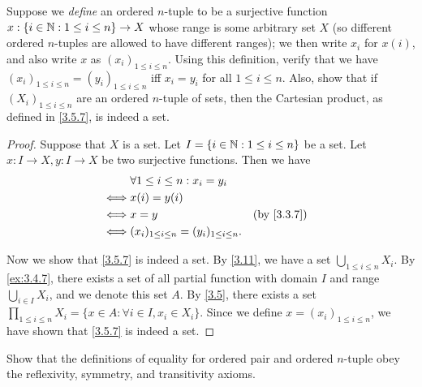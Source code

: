 \begin{ex}\label{ex:3.5.2}
  Suppose we \emph{define} an ordered \(n\)-tuple to be a surjective function \(x : \{i \in \mathbb{N} : 1 \leq i \leq n\} \to X\) whose range is some arbitrary set \(X\) (so different ordered \(n\)-tuples are allowed to have different ranges);
  we then write \(x_i\) for \(x(i)\), and also write \(x\) as \((x_i)_{1 \leq i \leq n}\).
  Using this definition, verify that we have \((x_i)_{1 \leq i \leq n} = (y_i)_{1 \leq i \leq n}\) iff \(x_i = y_i\) for all \(1 \leq i \leq n\).
  Also, show that if \((X_i)_{1 \leq i \leq n}\) are an ordered \(n\)-tuple of sets, then the Cartesian product, as defined in \cref{3.5.7}, is indeed a set.
\end{ex}

\begin{proof}
  Suppose that \(X\) is a set.
  Let \(I = \{i \in \mathbb{N} : 1 \leq i \leq n\}\) be a set.
  Let \(x : I \to X, y : I \to X\) be two surjective functions.
  Then we have
  \begin{align*}
         & \forall 1 \leq i \leq n : x_i = y_i                                \\
    \iff & x(i) = y(i)                                                        \\
    \iff & x = y                                              &  & \by{3.3.7} \\
    \iff & (x_i)_{1 \leq i \leq n} = (y_i)_{1 \leq i \leq n}.
  \end{align*}

  Now we show that \cref{3.5.7} is indeed a set.
  By \cref{3.11}, we have a set \(\bigcup_{1 \leq i \leq n} X_i\).
  By \cref{ex:3.4.7}, there exists a set of all partial function with domain \(I\) and range \(\bigcup_{i \in I} X_i\), and we denote this set \(A\).
  By \cref{3.5}, there exists a set \(\prod_{1 \leq i \leq n} X_i = \{x \in A : \forall i \in I, x_i \in X_i\}\).
  Since we define \(x = (x_i)_{1 \leq i \leq n}\), we have shown that \cref{3.5.7} is indeed a set.
\end{proof}

\begin{ex}\label{ex:3.5.3}
  Show that the definitions of equality for ordered pair and ordered \(n\)-tuple obey the reflexivity, symmetry, and transitivity axioms.
\end{ex}

